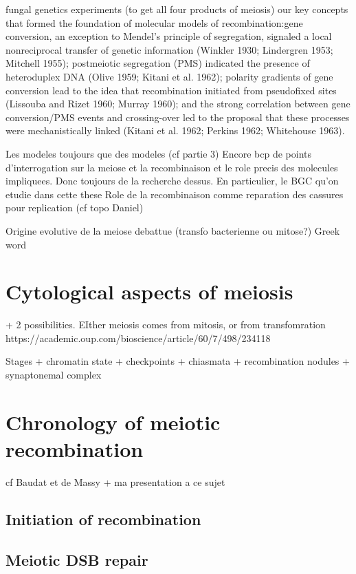 fungal genetics experiments (to get all four products of meiosis)
our key concepts that formed the foundation of molecular models of recombination:gene conversion, an exception to Mendel’s principle of segregation, signaled a local nonreciprocal transfer of genetic information (Winkler 1930; Lindergren 1953; Mitchell 1955); postmeiotic segregation (PMS) indicated the presence of heteroduplex DNA (Olive 1959; Kitani et al. 1962); polarity gradients of gene conversion lead to the idea that recombination initiated from pseudofixed sites (Lissouba and Rizet 1960; Murray 1960); and the strong correlation between gene conversion/PMS events and crossing-over led to the proposal that these processes were mechanistically linked (Kitani et al. 1962; Perkins 1962; Whitehouse 1963).


Les modeles toujours que des modeles (cf partie 3)
Encore bcp de points d'interrogation sur la meiose et la recombinaison et le role precis des molecules impliquees. Donc toujours de la recherche dessus.
En particulier, le BGC qu'on etudie dans cette these
Role de la recombinaison comme reparation des cassures pour replication  (cf topo Daniel)


Origine evolutive de la meiose debattue (transfo bacterienne ou mitose?)
Greek word






\section{Cytological aspects of meiosis}
+ 2 possibilities. EIther meiosis comes from mitosis, or from transfomration https://academic.oup.com/bioscience/article/60/7/498/234118

Stages + chromatin state + checkpoints + chiasmata + recombination nodules + synaptonemal complex

\section{Chronology of meiotic recombination}
cf Baudat et de Massy + ma presentation a ce sujet
\subsection{Initiation of recombination}
\subsection{Meiotic DSB repair}
